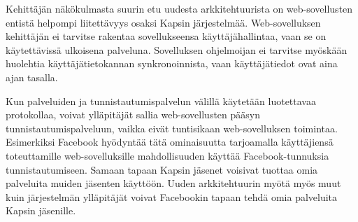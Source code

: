 Kehittäjän näkökulmasta suurin etu uudesta arkkitehtuurista on web-sovellusten entistä helpompi liitettävyys osaksi Kapsin järjestelmää. Web-sovelluksen kehittäjän ei tarvitse rakentaa sovellukseensa käyttäjähallintaa, vaan se on käytettävissä ulkoisena palveluna. Sovelluksen ohjelmoijan ei tarvitse myöskään huolehtia käyttäjätietokannan synkronoinnista, vaan käyttäjätiedot ovat aina ajan tasalla.

Kun palveluiden ja tunnistautumispalvelun välillä käytetään luotettavaa protokollaa, voivat ylläpitäjät sallia web-sovellusten pääsyn tunnistautumispalveluun, vaikka eivät tuntisikaan web-sovelluksen toimintaa. Esimerkiksi Facebook hyödyntää tätä ominaisuutta tarjoamalla käyttäjiensä toteuttamille web-sovelluksille mahdollisuuden käyttää Facebook-tunnuksia tunnistautumiseen. Samaan tapaan Kapsin jäsenet voisivat tuottaa omia palveluita muiden jäsenten käyttöön. Uuden arkkitehtuurin myötä myös muut kuin järjestelmän ylläpitäjät voivat Facebookin tapaan tehdä omia palveluita Kapsin jäsenille.
